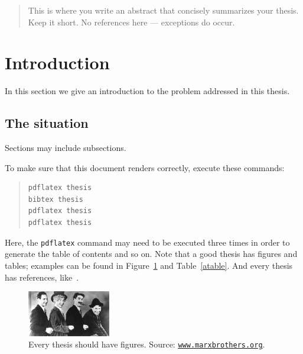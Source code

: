 \documentclass[12pt]{article}
\newcommand{\1}{\mathbbm{1}}
\begin{document}


\begin{abstract}
\noindent
This is where you write an abstract that concisely summarizes your thesis.
Keep it short. No references here --- exceptions do occur.
\end{abstract}

\bigskip

\thispagestyle{empty}
\tableofcontents
\thispagestyle{empty}

\clearpage
\setcounter{page}{1}

\section{Introduction} \label{introduction}

In this section we give an introduction to the problem addressed in this thesis.


\subsection{The situation}

Sections may include subsections.

To make sure that this document renders correctly, execute these commands:
\begin{quote}
\begin{verbatim}
pdflatex thesis
bibtex thesis
pdflatex thesis
pdflatex thesis
\end{verbatim}
\end{quote}
Here, the \verb|pdflatex| command may need to be executed three times in order to generate the table of contents and so on. 
Note that a good thesis has figures and tables; examples can be found in Figure~\ref{afigure} and Table~\ref{atable}. And every thesis has references, like~\cite{whatagreatpaper}.

\begin{figure}[!htbp]
\begin{center}
\includegraphics[height=2cm]{marxbrothers2}
\end{center}
\caption{Every thesis should have figures. Source: \href{www.marxbrothers.org}{\underline{\texttt{www.marxbrothers.org}}}.}\label{afigure}
\end{figure}
\end{document}
